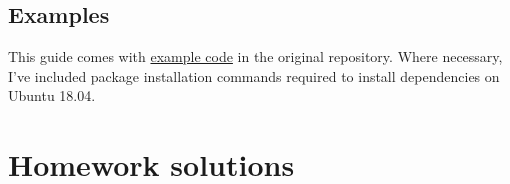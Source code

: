 \documentclass{article}
\newcommand{\lnk}[2]{\href{#1}{\textcolor[rgb]{1.0,0.0,0.0}{#2}}}
\begin{document}
  \subsection*{Examples}
  This guide comes with
  \lnk{https://github.com/spencertipping/data-science-in-ten-minutes/tree/master/example}{example
  code} in the original repository. Where necessary, I've included package
  installation commands required to install dependencies on Ubuntu 18.04.

  \newpage
  \newpage

  \newpage
  \section{Homework solutions}
  
  
\end{document}
